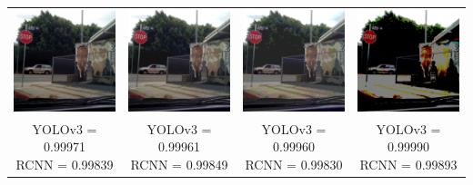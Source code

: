 \documentclass{article}
\begin{document}
\begin{center}
\begin{tabular}{ c c c c }
    \includegraphics[width=0.2\linewidth]{../test_images/stop3.png} & \includegraphics[width=0.2\linewidth]{../test_images/perturbed/stop3_contrast_0_050.png} & \includegraphics[width=0.2\linewidth]{../test_images/perturbed/stop3_contrast_0_025.png} & \includegraphics[width=0.2\linewidth]{../test_images/perturbed/stop3_contrast_0_010.png} \\
    \makecell{YOLOv3 = 0.99971 \\ RCNN = 0.99839} & \makecell{YOLOv3 = 0.99961 \\ RCNN = 0.99849} & \makecell{YOLOv3 = 0.99960 \\ RCNN = 0.99830} & \makecell{YOLOv3 = 0.99990 \\ RCNN = 0.99893} \\  
\end{tabular}
\end{center}
\end{document}
